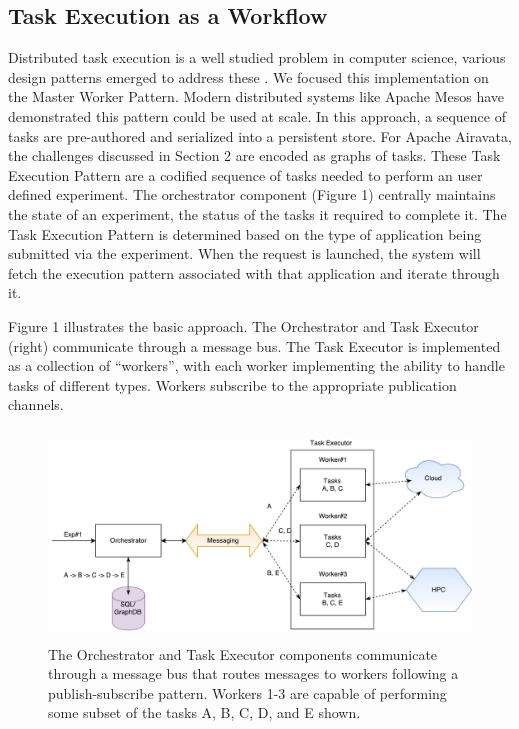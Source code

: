 \documentclass[review]{elsarticle}
\begin{document}
\subsection{Task Execution as a Workflow}
Distributed task execution is a well studied problem in computer science, various design patterns emerged to address these \cite{gamma1995design}. We focused this implementation on the Master Worker Pattern. Modern distributed systems like Apache Mesos\cite{apacheMesos} have demonstrated this pattern could be used at scale. In this approach, a sequence of tasks are pre-authored and serialized into a persistent store. For Apache Airavata, the challenges discussed in Section 2 are encoded as graphs of tasks. These Task Execution Pattern are a codified sequence of tasks needed to perform an user defined experiment.  The orchestrator component (Figure 1) centrally maintains the state of an experiment, the status of the tasks it required to complete it. The Task Execution Pattern is determined based on the type of application being submitted via the experiment.  When the request is launched, the system will fetch the execution pattern associated with that application and iterate through it.

Figure 1 illustrates the basic approach. The Orchestrator and Task Executor (right) communicate through a message bus.  The Task Executor is implemented as a collection of ``workers'', with each worker implementing the ability to handle tasks of different types. Workers subscribe to the appropriate publication channels.

\begin{figure}
\centering
\includegraphics[height=2.2in, width=4.8 in]{figures/figure1.pdf}
\caption{The Orchestrator and Task Executor components communicate through a message bus that routes messages to workers following a publish-subscribe pattern. Workers 1-3 are capable of performing some subset of the tasks A, B, C, D, and E shown.}
\end{figure}
\end{document}
